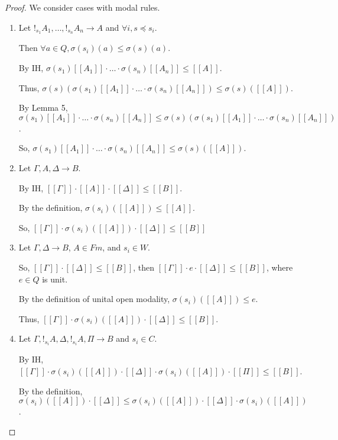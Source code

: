 \documentclass[a4paper]{article}
\begin{document}
\begin{proof}
We consider cases with modal rules.

\begin{enumerate}

\item Let $!_{s_1} A_1, \dots, !_{s_n} A_n \rightarrow A$ and $\forall i, s \preceq s_i$.

Then $\forall a \in Q, \sigma(s_i)(a) \leq \sigma(s)(a)$.

By IH, $\sigma(s_1)[\![A_1]\!] \cdot \dots \cdot \sigma(s_n) [\![A_n]\!] \leq [\![A]\!]$.

Thus, $\sigma(s)(\sigma(s_1)[\![A_1]\!] \cdot \dots \cdot \sigma(s_n) [\![A_n]\!]) \leq \sigma(s)([\![A]\!])$.

By Lemma 5, $\sigma(s_1)[\![A_1]\!] \cdot \dots \cdot \sigma(s_n) [\![A_n]\!] \leq \sigma(s)(\sigma(s_1)[\![A_1]\!] \cdot \dots \cdot \sigma(s_n) [\![A_n]\!])$.

So, $\sigma(s_1)[\![A_1]\!] \cdot \dots \cdot \sigma(s_n) [\![A_n]\!] \leq \sigma(s)([\![A]\!])$.

\item Let $\Gamma, A, \Delta \rightarrow B$.

By IH, $[\![\Gamma]\!] \cdot [\![A]\!] \cdot [\![\Delta]\!] \leq [\![B]\!]$.

By the definition, $\sigma(s_i)([\![A]\!]) \leq [\![A]\!]$.

So, $[\![\Gamma]\!] \cdot \sigma(s_i)([\![A]\!]) \cdot [\![\Delta]\!] \leq [\![B]\!]$

\item Let $\Gamma, \Delta \rightarrow B$, $A \in Fm$, and $s_i \in W$.

So, $[\![\Gamma]\!] \cdot [\![\Delta]\!] \leq [\![B]\!]$,
then $[\![\Gamma]\!] \cdot e \cdot [\![\Delta]\!] \leq [\![B]\!]$, where $e \in Q$ is unit.

By the definition of unital open modality, $\sigma(s_i)([\![A]\!]) \leq e$.

Thus, $[\![\Gamma]\!] \cdot \sigma(s_i)([\![A]\!]) \cdot [\![\Delta]\!] \leq [\![B]\!]$.

\item Let $\Gamma, !_{s_i} A, \Delta, !_{s_i} A, \Pi \rightarrow B$ and $s_i \in C$.

By IH, $[\![\Gamma]\!] \cdot \sigma(s_i)([\![A]\!]) \cdot [\![\Delta]\!] \cdot \sigma(s_i)([\![A]\!]) \cdot [\![\Pi]\!] \leq [\![B]\!]$.

By the definition, $\sigma(s_i)([\![A]\!]) \cdot [\![\Delta]\!] \leq \sigma(s_i)([\![A]\!]) \cdot [\![\Delta]\!] \cdot \sigma(s_i)([\![A]\!])$.


\end{enumerate}
\end{proof}
\end{document}
